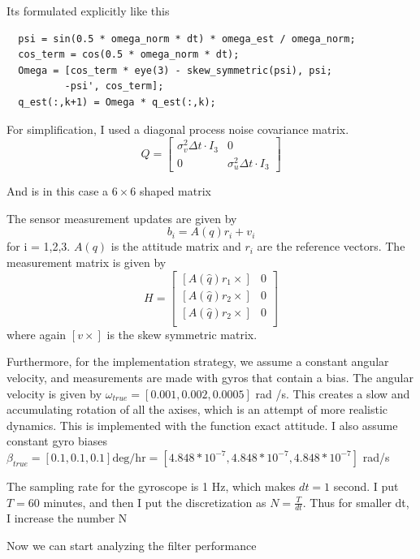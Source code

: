 \documentclass[12pt,A4, onecolumn]{exam}
\begin{document}
\begin{questions}
\begin{solution}
  Its formulated explicitly like this
  \begin{verbatim}
  psi = sin(0.5 * omega_norm * dt) * omega_est / omega_norm;
  cos_term = cos(0.5 * omega_norm * dt);
  Omega = [cos_term * eye(3) - skew_symmetric(psi), psi;
          -psi', cos_term];
  q_est(:,k+1) = Omega * q_est(:,k);
  \end{verbatim}
  
  


  For simplification, I used a diagonal process noise covariance matrix. $$ Q = \begin{bmatrix}
     \sigma_v^2 \Delta t \cdot I_3 & 0 \\
     0 & \sigma_u^2 \Delta t \cdot I_3
  \end{bmatrix}  $$

  And is in this case a $ 6 \times 6 $ shaped matrix 


  The sensor measurement updates are given by 
  \[
      b_i = A(q)r_i + v_i
  \]
  for i = 1,2,3. $ A(q) $ is the attitude matrix and $ r_i $ are the reference vectors. The measurement matrix is given by 
  \[
      H = \begin{bmatrix}
          \left[ A(\hat{q}) r_1 \times \right] & 0 \\
          \left[ A(\hat{q}) r_2 \times \right] & 0 \\ 
          \left[ A(\hat{q}) r_2 \times \right] & 0 \\
    \end{bmatrix} 
  \]
  where again $ \left[ v \times \right]  $ is the skew symmetric matrix. 
  
  Furthermore, for the implementation strategy, we assume a constant angular velocity, and measurements are made with gyros that contain a bias. The angular velocity is given by $ \omega_{true} = \left[ 0.001, 0.002, 0.0005 \right]$ rad /s. This creates a slow and accumulating rotation of all the axises, which is an attempt of more realistic dynamics. This is implemented with the function exact attitude. I also assume constant gyro biases
  $ \beta_{true} = \left[ 0.1, 0.1, 0.1 \right] \text{deg/hr} = \left[ 4.848*10^{-7}, 4.848*10^{-7}, 4.848*10^{-7} \right]$ rad/s

  The sampling rate for the gyroscope is 1 Hz, which makes $ dt = 1  $ second. I put $ T = 60 $ minutes, and then I put the discretization as $ N = \frac{ T }{ dt } $. Thus for smaller dt, I increase the number N  


  Now we can start analyzing the filter performance


\end{solution}
\end{questions}
\end{document}
